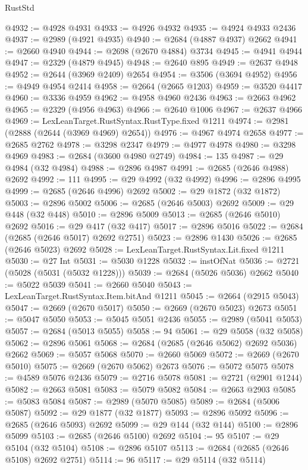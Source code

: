 \begin{lexlean}{RustStd}
\begin{coremodule}
@4932 := @4928 @4931
@4933 := @4926 @4932
@4935 := @4924 @4933 @2436
@4937 := @2989 (@4921 @4935)
@4940 := @2684 (@4887 @4937) @2662
@4941 := @2660 @4940
@4944 := @2698 (@2670 @4884) @3734
@4945 := @4941 @4944
@4947 := @2329 (@4879 @4945)
@4948 := @2640 @895
@4949 := @2637 @4948
@4952 := @2644 (@3969 @2409) @2654
@4954 := @3506 (@3694 @4952)
@4956 := @4949 @4954 @2414
@4958 := @2664 (@2665 @1203)
@4959 := @3520 @4417
@4960 := @3336 @4959
@4962 := @4958 @4960 @2436
@4963 := @2663 @4962
@4965 := @2329 (@4956 @4963)
@4966 := @2640 @1006
@4967 := @2637 @4966
@4969 := LexLeanTarget.RustSyntax.RustType.fixed @1211
@4974 := @2981 (@2888 (@2644 (@3969 @4969) @2654))
@4976 := @4967 @4974 @2658
@4977 := @2685 @2762
@4978 := @3298 @2347
@4979 := @4977 @4978
@4980 := @3298 @4969
@4983 := @2684 (@3600 @4980 @2749)
@4984 := 135
@4987 := @29 @4984 (@32 @4984)
@4988 := @2896 @4987
@4991 := @2685 (@2646 @4988) @2692
@4992 := 111
@4995 := @29 @4992 (@32 @4992)
@4996 := @2896 @4995
@4999 := @2685 (@2646 @4996) @2692
@5002 := @29 @1872 (@32 @1872)
@5003 := @2896 @5002
@5006 := @2685 (@2646 @5003) @2692
@5009 := @29 @448 (@32 @448)
@5010 := @2896 @5009
@5013 := @2685 (@2646 @5010) @2692
@5016 := @29 @417 (@32 @417)
@5017 := @2896 @5016
@5022 := @2684 (@2685 (@2646 @5017) @2692 @2751)
@5023 := @2896 @1430
@5026 := @2685 (@2646 @5023) @2692
@5028 := LexLeanTarget.RustSyntax.Lit.fixed @1211
@5030 := @27 Int
@5031 := @5030 @1228
@5032 := instOfNat
@5036 := @2721 (@5028 (@5031 (@5032 @1228)))
@5039 := @2684 (@5026 @5036) @2662
@5040 := @5022 @5039
@5041 := @2660 @5040
@5043 := LexLeanTarget.RustSyntax.Item.bitAnd @1211
@5045 := @2664 (@2915 @5043)
@5047 := @2669 (@2670 @5017)
@5050 := @2669 (@2670 @5023) @2673
@5051 := @5047 @5050
@5053 := @5045 @5051 @2436
@5055 := @2989 (@5041 @5053)
@5057 := @2684 (@5013 @5055)
@5058 := 94
@5061 := @29 @5058 (@32 @5058)
@5062 := @2896 @5061
@5068 := @2684 (@2685 (@2646 @5062) @2692 @5036) @2662
@5069 := @5057 @5068
@5070 := @2660 @5069
@5072 := @2669 (@2670 @5010)
@5075 := @2669 (@2670 @5062) @2673
@5076 := @5072 @5075
@5078 := @4589 @5076 @2436
@5079 := @2716 @5078
@5081 := @2721 (@2901 @1244)
@5082 := @2663 @5081
@5083 := @5079 @5082
@5084 := @2663 @2903
@5085 := @5083 @5084
@5087 := @2989 (@5070 @5085)
@5089 := @2684 (@5006 @5087)
@5092 := @29 @1877 (@32 @1877)
@5093 := @2896 @5092
@5096 := @2685 (@2646 @5093) @2692
@5099 := @29 @144 (@32 @144)
@5100 := @2896 @5099
@5103 := @2685 (@2646 @5100) @2692
@5104 := 95
@5107 := @29 @5104 (@32 @5104)
@5108 := @2896 @5107
@5113 := @2684 (@2685 (@2646 @5108) @2692 @2751)
@5114 := 96
@5117 := @29 @5114 (@32 @5114)

\end{coremodule}
\end{lexlean}
